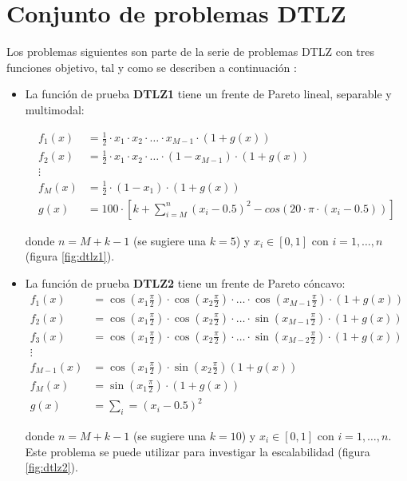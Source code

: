   
\section{Conjunto de problemas DTLZ} 

Los problemas siguientes son parte de la serie de problemas DTLZ con tres funciones objetivo, tal y como se describen a continuaci\'on 
\cite{dtlz2002a}:

\begin{itemize}
\item La funci\'on de prueba \textbf{DTLZ1} tiene un frente de Pareto lineal, separable y multimodal:

\begin{align*}
f_1(x)&=\frac{1}{2}\cdot x_1\cdot x_2 \cdot \ldots \cdot x_{M-1} \cdot (1+g(x))\\
f_2(x)&=\frac{1}{2}\cdot x_1\cdot x_2 \cdot \ldots \cdot(1-x_{M-1})\cdot(1+g(x))\\
\vdots&\\
f_M(x)&=\frac{1}{2}\cdot(1-x_1)\cdot(1+g(x))\\
g(x)&=100\cdot[k+\sum_{i=M}^n(x_i-0.5)^2-cos(20\cdot\pi\cdot(x_i-0.5))]
\end{align*}

donde $n=M+k-1$ (se sugiere una $k=5$) y $x_i\in[0,1]$ con $i = 1, \ldots, n$ (figura \ref{fig:dtlz1}).


 \item La funci\'on de prueba \textbf{DTLZ2} tiene un frente de Pareto c\'oncavo:
\begin{align*}
f_1(x)&=\cos(x_1\frac{\pi}{2})\cdot\cos(x_2\frac{\pi}{2})\cdot\ldots\cdot\cos(x_{M-1}\frac{\pi}{2})\cdot(1+g(x))\\
f_2(x)&=\cos(x_1\frac{\pi}{2})\cdot\cos(x_2\frac{\pi}{2})\cdot\ldots\cdot\sin(x_{M-1}\frac{\pi}{2})\cdot(1+g(x))\\
f_3(x)&=\cos(x_1\frac{\pi}{2})\cdot\cos(x_2\frac{\pi}{2})\cdot\ldots\cdot\sin(x_{M-2}\frac{\pi}{2})\cdot(1+g(x))\\
\vdots&\\
f_{M-1}(x)&=\cos(x_1\frac{\pi}{2})\cdot\sin(x_2\frac{\pi}{2})(1+g(x))\\
f_{M}(x)&=\sin(x_1\frac{\pi}{2})\cdot(1+g(x))\\
g(x)&=\sum_i=(x_i-0.5)^2
\end{align*}

donde $n=M+k-1$ (se sugiere una $k=10$) y $x_i\in[0,1]$ con $i= 1, \ldots, n$. Este problema se puede utilizar para investigar la 
escalabilidad (figura \ref{fig:dtlz2}).


\end{itemize}
